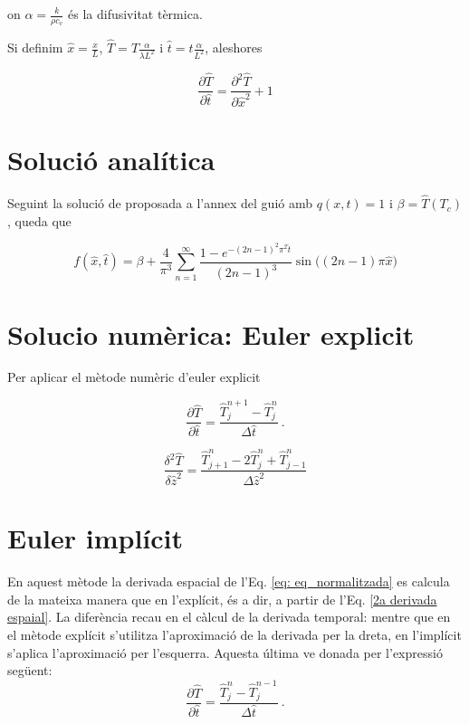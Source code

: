 \documentclass[11pt]{article}
\begin{document}
on $\alpha=\frac{k}{\rho c_v}$ és la difusivitat tèrmica.

Si definim $\hat{x}=\frac{x}{L}$, $\hat{T}=T \frac{\alpha}{\lambda L^2}$ i $\hat{t}=t\frac{\alpha}{L^2}$, aleshores

\begin{equation}
    \frac{\partial \hat{T}}{\partial \hat{t}} = \frac{\partial^2 \hat{T}}{\partial \hat{x}^2} + 1
\label{eq: eq_normalitzada}
\end{equation}

\section{Solució analítica}


Seguint la solució de proposada a l'annex del guió amb $q(x,t)=1$ i $\beta=\hat{T}(T_c)$, queda que



\begin{equation}
    f(\hat{x}, \hat{t}) = \beta + \frac{4}{\pi^3} \sum_{n=1}^{\infty} \frac{1 - e^{-(2n-1)^2 \pi^2 \hat{t}}}{(2n-1)^3} \sin\big((2n-1)\pi \hat{x})
\label{eq: analitica}
\end{equation}


\section{Solucio numèrica: Euler explicit}

Per aplicar el mètode numèric d'euler explicit

\begin{equation}
    \frac{\partial \hat{T}}{\partial \hat{t}} = \frac{\hat{T}_j^{n+1} - \hat{T}_j^n}{\Delta \hat{t}} \ .
    \label{derivada per la dreta}
\end{equation}

\begin{equation}
    \frac{\delta^2 \hat{T}}{\delta \hat{z}^2} = \frac{\hat{T}_{j+1}^n - 2\hat{T}_{j}^n + \hat{T}_{j-1}^n}{\Delta \hat{z}^2}
    \label{2a derivada espaial}
\end{equation}

\section{Euler implícit}
En aquest mètode la derivada espacial de l'Eq. \eqref{eq: eq_normalitzada} es calcula de la mateixa manera que en l'explícit, és a dir, a partir de l'Eq. \eqref{2a derivada espaial}. La diferència recau en el càlcul de la derivada temporal: mentre que en el mètode explícit s'utilitza l'aproximació de la derivada per la dreta, en l'implícit s'aplica l'aproximació per l'esquerra. Aquesta última ve donada per l'expressió següent:
\begin{equation}
    \frac{\partial \hat{T}}{\partial \hat{t}} = \frac{\hat{T}_j^n - \hat{T}_j^{n-1}}{\Delta \hat{t}} \ .
    \label{derivada per lesquerra}
\end{equation}
\end{document}
